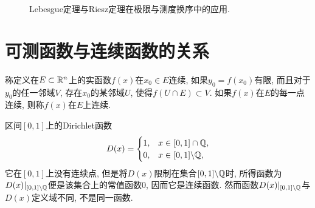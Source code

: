 \begin{center}
\begin{figure}[h!]
\caption{Lebesgue定理与Riesz定理在极限与测度换序中的应用.}
\end{figure}
\end{center}


%
%

\section{可测函数与连续函数的关系}

\begin{definition}[连续函数]
	称定义在$E \subset \mathbb{R}^n$上的实函数$f(x)$在$x_0 \in E$连续, 
	如果$y_0 = f(x_0)$有限, 
	而且对于$y_0$的任一邻域$V$, 存在$x_0$的某邻域$U$, 
	使得$f(U \cap E) \subset V$. 
	如果$f(x)$在$E$的每一点连续, 则称$f(x)$在$E$上连续.
\end{definition}

\begin{example}
	区间$[0,1]$上的Dirichlet函数
	$$
	D(x) = 
	\begin{cases}
		1, & x \in [0,1] \cap \mathbb{Q}, \\
		0, & x \in [0,1] \backslash \mathbb{Q},
	\end{cases}
	$$
	它在$[0,1]$上没有连续点, 但是将$D(x)$限制在集合$[0,1] \backslash \mathbb{Q}$时, 
	所得函数为$D(x)|_{[0,1] \backslash \mathbb{Q}}$便是该集合上的常值函数$0$, 因而它是连续函数. 
	然而函数$D(x)|_{[0,1] \backslash \mathbb{Q}}$与$D(x)$定义域不同, 不是同一函数. 
\end{example}

